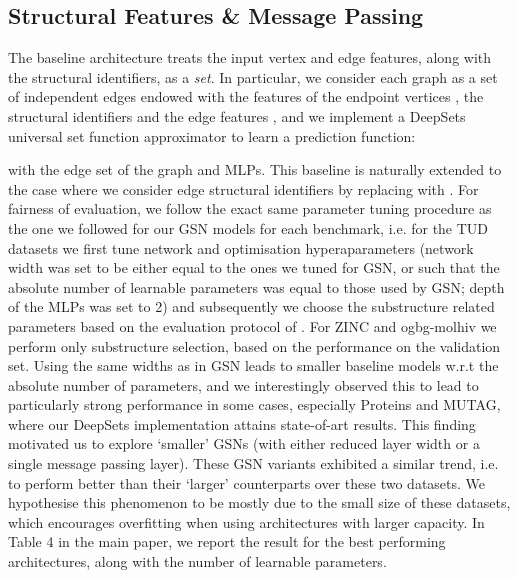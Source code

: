         

        
        
        






\subsection{Structural Features \& Message Passing}\label{deepset_appendix}

The baseline architecture treats the input vertex and edge features, along with the structural identifiers, as a \textit{set}. In particular, we consider each graph as a set of independent edges  endowed with the features of the endpoint vertices , the structural identifiers  and the edge features , and we implement a DeepSets universal set function approximator \cite{zaheer2017deep} to learn a prediction function:
{\small

}
with  the edge set of the graph and  MLPs. This baseline is naturally extended to the case where we consider edge structural identifiers by replacing  with . For fairness of evaluation, we follow the exact same parameter tuning procedure as the one we followed for our GSN models for each benchmark, i.e. for the TUD datasets we first tune network and optimisation hyperaparameters (network width was set to be either equal to the ones we tuned for GSN, or such that the absolute number of learnable parameters was equal to those used by GSN; depth of the MLPs was set to 2) and subsequently we choose the substructure related parameters based on the evaluation protocol of \cite{xu2018how}. For ZINC and ogbg-molhiv we perform only substructure selection, based on the performance on the validation set. Using the same widths as in GSN leads to smaller baseline models w.r.t the absolute number of parameters, and we interestingly observed this to lead to particularly strong performance in some cases, especially Proteins and MUTAG, where our DeepSets implementation attains state-of-art results. This finding motivated us to explore `smaller' GSNs (with either reduced layer width or a single message passing layer). These GSN variants exhibited a similar trend, i.e. to perform better than their `larger' counterparts over these two datasets. We hypothesise this phenomenon to be mostly due to the small size of these datasets, which encourages overfitting when using architectures with larger capacity. In Table 4 in the main paper, we report the result for the best performing architectures, along with the number of learnable parameters.


